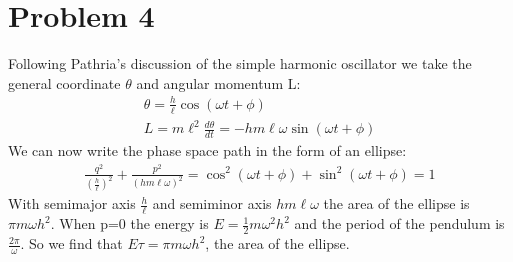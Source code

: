 \documentclass[a4paper,12pt]{article}
\numberwithin{equation}{section}
\begin{document}
\section{Problem 4}
Following Pathria's discussion of the simple harmonic oscillator we take the general coordinate $\theta$ and angular momentum L:
\begin{gather}
 \theta=\frac{h}{\ell}\cos{(\omega t+\phi)}\\
 L=m\ell^2\frac{d\theta}{dt}=-hm\ell\omega\sin{(\omega t+\phi)}
\end{gather}
We can now write the phase space path in the form of an ellipse:
\begin{gather}
 \frac{q^2}{(\frac{h}{\ell})^2}+\frac{p^2}{(hm\ell\omega)^2}=
 \cos^2{(\omega t+\phi)}+\sin^2{(\omega t+\phi)}=1
\end{gather}
With semimajor axis $\frac{h}{\ell}$ and semiminor axis $hm\ell\omega$ the area of the ellipse is $\pi m\omega h^2$.
When p=0 the energy is $E=\frac{1}{2}m\omega^2h^2$ and the period of the pendulum is $\frac{2\pi}{\omega}$.
So we find that $E\tau = \pi m\omega h^2$, the area of the ellipse.
\end{document}
